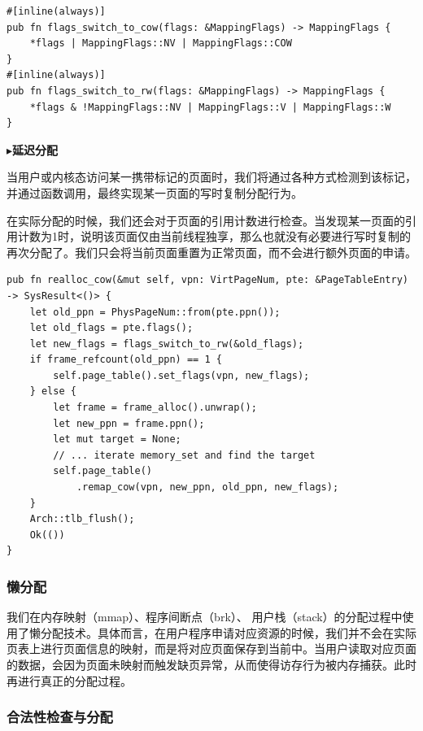 \documentclass{article}
\begin{document}
\begin{lstlisting}
#[inline(always)]
pub fn flags_switch_to_cow(flags: &MappingFlags) -> MappingFlags {
    *flags | MappingFlags::NV | MappingFlags::COW
}
#[inline(always)]
pub fn flags_switch_to_rw(flags: &MappingFlags) -> MappingFlags {
    *flags & !MappingFlags::NV | MappingFlags::V | MappingFlags::W
}
\end{lstlisting}

$\blacktriangleright$\textbf{延迟分配}

当用户或内核态访问某一携带标记的页面时，我们将通过各种方式检测到该标记，并通过函数调用，最终实现某一页面的写时复制分配行为。

在实际分配的时候，我们还会对于页面的引用计数进行检查。当发现某一页面的引用计数为1时，说明该页面仅由当前线程独享，那么也就没有必要进行写时复制的再次分配了。我们只会将当前页面重置为正常页面，而不会进行额外页面的申请。

\begin{lstlisting}
pub fn realloc_cow(&mut self, vpn: VirtPageNum, pte: &PageTableEntry) -> SysResult<()> {
    let old_ppn = PhysPageNum::from(pte.ppn());
    let old_flags = pte.flags();
    let new_flags = flags_switch_to_rw(&old_flags);
    if frame_refcount(old_ppn) == 1 {
        self.page_table().set_flags(vpn, new_flags);
    } else {
        let frame = frame_alloc().unwrap();
        let new_ppn = frame.ppn();
        let mut target = None;
        // ... iterate memory_set and find the target
        self.page_table()
            .remap_cow(vpn, new_ppn, old_ppn, new_flags);
    }
    Arch::tlb_flush();
    Ok(())
}
\end{lstlisting}

\subsubsection{懒分配}

我们在内存映射（mmap）、程序间断点（brk）、 用户栈（stack）的分配过程中使用了懒分配技术。具体而言，在用户程序申请对应资源的时候，我们并不会在实际页表上进行页面信息的映射，而是将对应页面保存到当前中。当用户读取对应页面的数据，会因为页面未映射而触发缺页异常，从而使得访存行为被内存捕获。此时再进行真正的分配过程。

\subsubsection{合法性检查与分配}
\end{document}
